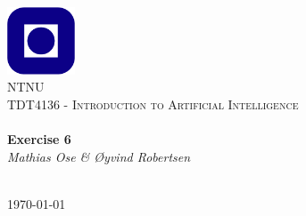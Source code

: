 \begin{titlepage}
\begin{center}
\includegraphics[width=0.15\textwidth]{img/NTNU.png}~\\[1cm]

\textsc{\LARGE NTNU}\\[1.5cm]

\textsc{\Large TDT4136 - Introduction to Artificial Intelligence}\\[0.5cm]

\HRule \\[0.4cm]
{ \huge \bfseries Exercise 6}\\[0.5cm]
{\large \textit{Mathias Ose \& Øyvind Robertsen}}\\[0.2cm]
\HRule \\[1.5cm]



\vfill

{\large \today}
\end{center}
\end{titlepage}
